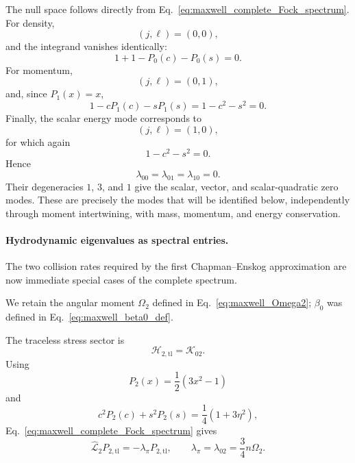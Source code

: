 \documentclass[11pt,oneside]{article}
\numberwithin{equation}{section}
\theoremstyle{definition}
\begin{document}
The null space follows directly from
Eq.~\eqref{eq:maxwell_complete_Fock_spectrum}.  For density,
\begin{equation}
(j,\ell)=(0,0),
\end{equation}
and the integrand vanishes identically:
\begin{equation}
1+1-P_0(c)-P_0(s)=0.
\end{equation}
For momentum,
\begin{equation}
(j,\ell)=(0,1),
\end{equation}
and, since $P_1(x)=x$,
\begin{equation}
1-cP_1(c)-sP_1(s)
=
1-c^2-s^2
=
0.
\end{equation}
Finally, the scalar energy mode corresponds to
\begin{equation}
(j,\ell)=(1,0),
\end{equation}
for which again
\begin{equation}
1-c^2-s^2=0.
\end{equation}
Hence
\begin{equation}
\lambda_{00}
=
\lambda_{01}
=
\lambda_{10}
=
0.
\label{eq:maxwell_spectral_zero_modes}
\end{equation}
Their degeneracies $1$, $3$, and $1$ give the scalar, vector, and
scalar-quadratic zero modes.  These are precisely the modes that will be
identified below, independently through moment intertwining, with mass,
momentum, and energy conservation.

\paragraph{Hydrodynamic eigenvalues as spectral entries.}

The two collision rates required by the first Chapman--Enskog
approximation are now immediate special cases of the complete spectrum.

We retain the angular moment $\Omega_2$ defined in Eq.~\eqref{eq:maxwell_Omega2}; $\beta_0$ was defined in Eq.~\eqref{eq:maxwell_beta0_def}.

The traceless stress sector is
\begin{equation}
\mathscr H_{2,\mathrm{tl}}
=
\mathscr K_{02}.
\end{equation}
Using
\begin{equation}
P_2(x)=\frac12(3x^2-1)
\end{equation}
and
\begin{equation}
c^2P_2(c)+s^2P_2(s)
=
\frac14(1+3\eta^2),
\end{equation}
Eq.~\eqref{eq:maxwell_complete_Fock_spectrum} gives
\begin{equation}
\widehat{\mathcal L}_2
P_{2,\mathrm{tl}}
=
-\lambda_\pi P_{2,\mathrm{tl}},
\qquad
\lambda_\pi
=
\lambda_{02}
=
\frac34n\Omega_2.
\label{eq:maxwell_lambda_pi}
\end{equation}
\end{document}
